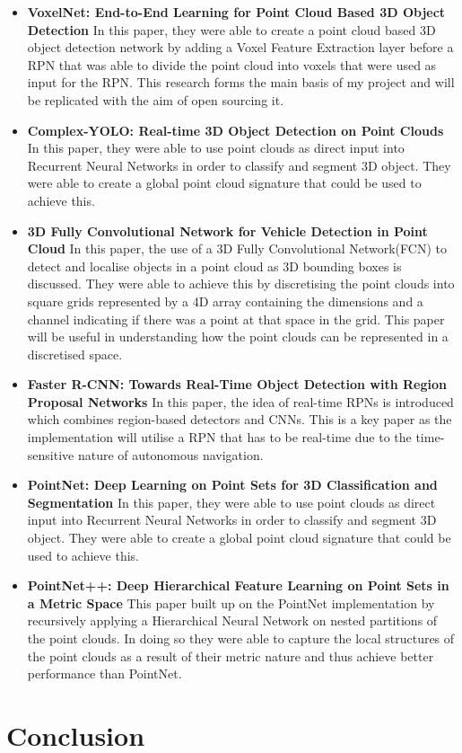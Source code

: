 \begin{itemize}
    \item \textbf{VoxelNet: End-to-End Learning for Point Cloud Based 3D Object Detection} \cite{zhou2017voxelnet}
    In this paper, they were able to create a point cloud based 3D object detection network by adding a Voxel Feature Extraction layer before a RPN that was able to divide the point cloud into voxels that were used as input for the RPN. 
    This research forms the main basis of my project and will be replicated with the aim of open sourcing it. 
    
     \item \textbf{Complex-YOLO: Real-time 3D Object Detection on Point Clouds} \cite{yolo}
    In this paper, they were able to use point clouds as direct input into Recurrent Neural Networks in order to classify and segment 3D object. They were able to create a global point cloud signature that could be used to achieve this.
    
    \item \textbf{3D Fully Convolutional Network for Vehicle Detection in Point Cloud} \cite{li20163d}
    In this paper, the use of a 3D Fully Convolutional Network(FCN) to detect and localise objects in a point cloud as 3D bounding boxes is discussed. They were able to achieve this by discretising the point clouds into square grids represented by a 4D array containing the dimensions and a channel indicating if there was a point at that space in the grid. This paper will be useful in understanding how the point clouds can be represented in a discretised space.
    
    
    \item \textbf{Faster R-CNN: Towards Real-Time Object Detection with Region Proposal Networks} \cite{ren2015faster}
    In this paper, the idea of real-time RPNs is introduced which combines region-based detectors\cite{girshickICCV15fastrcnn} and CNNs. This is a key paper as the implementation will utilise a RPN that has to be real-time due to the time-sensitive nature of autonomous navigation. 
    
    
    \item \textbf{PointNet: Deep Learning on Point Sets for 3D Classification and Segmentation} \cite{qi2017pointnet}
    In this paper, they were able to use point clouds as direct input into Recurrent Neural Networks in order to classify and segment 3D object. They were able to create a global point cloud signature that could be used to achieve this.
    
    \item \textbf{PointNet++: Deep Hierarchical Feature Learning on Point Sets in a Metric Space} \cite{qi2017pointnet++}
    This paper built up on the PointNet implementation by recursively applying a Hierarchical Neural Network on nested partitions of the point clouds. In doing so they were able to capture the local structures of the point clouds as a result of their metric nature and thus achieve better performance than PointNet. 



\end{itemize}





\section{Conclusion}




